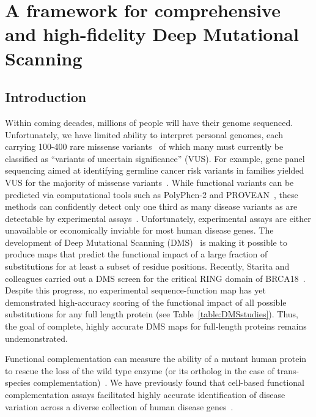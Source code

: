 

\chapter[High-fidelity and comprehensive DMS framework]{A framework for comprehensive and high-fidelity Deep Mutational Scanning}

\section{Introduction}

Within coming decades, millions of people will have their genome sequenced. Unfortunately, we have limited ability to interpret personal genomes, each carrying 100-400 rare missense variants~\cite{the_1000_genomes_project_consortium_global_2015} of which many must currently be classified as ``variants of uncertain significance'' (VUS). For example, gene panel sequencing aimed at identifying germline cancer risk variants in families yielded VUS for the majority of missense variants~\cite{maxwell_evaluation_2016}.  While functional variants can be predicted via computational tools such as PolyPhen-2\cite{adzhubei_method_2010} and PROVEAN~\cite{choi_fast_2012}, these methods can confidently detect only one third as many disease variants as are detectable by experimental assays~\cite{sun_extended_2016}. Unfortunately, experimental assays are either unavailable or economically inviable for most human disease genes. The development of Deep Mutational Scanning (DMS)~\cite{fowler_high-resolution_2010} is making it possible to produce maps that predict the functional impact of a large fraction of substitutions for at least a subset of residue positions. Recently, Starita and colleagues carried out a DMS screen for the critical RING domain of BRCA18~\cite{starita_massively_2015}. Despite this progress, no experimental sequence-function map has yet demonstrated high-accuracy scoring of the functional impact of all possible substitutions for any full length protein (see Table~\ref{table:DMSstudies}). Thus, the goal of complete, highly accurate DMS maps for full-length proteins remains undemonstrated.

Functional complementation can measure the ability of a mutant human protein to rescue the loss of the wild type enzyme (or its ortholog in the case of trans-species complementation)~\cite{9,10}. We have previously found that cell-based functional complementation assays facilitated highly accurate identification of disease variation across a diverse collection of human disease genes~\cite{sun_extended_2016}. 

